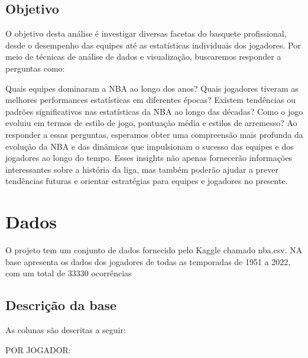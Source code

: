\documentclass[
]{book}
\begin{document}
\hypertarget{objetivo}{%
\section{Objetivo}\label{objetivo}}

O objetivo desta análise é investigar diversas facetas do basquete profissional, desde o desempenho das equipes até as estatísticas individuais dos jogadores. Por meio de técnicas de análise de dados e visualização, buscaremos responder a perguntas como:

Quais equipes dominaram a NBA ao longo dos anos? Quais jogadores tiveram as melhores performances estatísticas em diferentes épocas? Existem tendências ou padrões significativos nas estatísticas da NBA ao longo das décadas? Como o jogo evoluiu em termos de estilo de jogo, pontuação média e estilos de arremesso? Ao responder a essas perguntas, esperamos obter uma compreensão mais profunda da evolução da NBA e das dinâmicas que impulsionam o sucesso das equipes e dos jogadores ao longo do tempo. Esses insights não apenas fornecerão informações interessantes sobre a história da liga, mas também poderão ajudar a prever tendências futuras e orientar estratégias para equipes e jogadores no presente.

\hypertarget{dados}{%
\chapter{Dados}\label{dados}}

O projeto tem um conjunto de dados fornecido pelo Kaggle chamado nba.csv. NA base apresenta os dados dos jogadores de todas as temporadas de 1951 a 2022, com um total de 33330 ocorrências

\hypertarget{descriuxe7uxe3o-da-base}{%
\section{Descrição da base}\label{descriuxe7uxe3o-da-base}}

As colunas são descritas a seguir:

POR JOGADOR:
\end{document}

